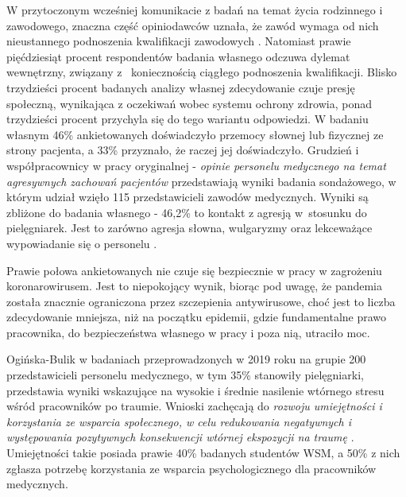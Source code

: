 \documentclass[a4paper,12pt,twoside,openright]{mwrep}
\begin{document}
W przytoczonym wcześniej komunikacie z badań na temat życia rodzinnego i zawodowego, znaczna część opiniodawców uznała, że zawód wymaga od nich nieustannego podnoszenia kwalifikacji zawodowych \cite{komunikat}. Natomiast prawie  pięćdziesiąt  procent respondentów  badania własnego  odczuwa dylemat wewnętrzny, związany z~ koniecznością ciągłego podnoszenia kwalifikacji.
 Blisko trzydzieści procent  badanych analizy własnej  zdecydowanie czuje presję społeczną, wynikająca z oczekiwań wobec systemu ochrony zdrowia,  ponad trzydzieści procent   przychyla się do tego wariantu odpowiedzi.  W badaniu własnym 46\%  ankietowanych doświadczyło przemocy słownej lub fizycznej ze strony pacjenta, a 33\%  przyznało, że  raczej jej doświadczyło.  Grudzień i współpracownicy w pracy oryginalnej - \textit{opinie personelu medycznego na temat agresywnych zachowań pacjentów} przedstawiają wyniki badania sondażowego, w którym udział wzięło 115 przedstawicieli zawodów medycznych. Wyniki są zbliżone do badania własnego - 46,2\% to kontakt z agresją w~stosunku do pielęgniarek. Jest to zarówno agresja słowna, wulgaryzmy oraz lekceważące wypowiadanie się o personelu \cite{grudzien}. 

  Prawie połowa ankietowanych nie  czuje się bezpiecznie w pracy w zagrożeniu koronarowirusem. Jest to niepokojący wynik, biorąc pod uwagę, że pandemia została znacznie ograniczona przez szczepienia antywirusowe, choć  jest to liczba zdecydowanie mniejsza, niż na początku epidemii, gdzie fundamentalne prawo pracownika, do bezpieczeństwa własnego w pracy i poza nią, utraciło moc.


 Ogińska-Bulik w badaniach przeprowadzonych w 2019 roku na grupie 200 przedstawicieli personelu medycznego, w tym 35\% stanowiły pielęgniarki, przedstawia wyniki wskazujące na wysokie i średnie nasilenie wtórnego stresu wśród pracowników po traumie. Wnioski zachęcają do \textit{rozwoju umiejętności i korzystania ze wsparcia społecznego, w celu redukowania negatywnych i występowania pozytywnych konsekwencji wtórnej ekspozycji na traumę} \cite{trauma}. 
  Umiejętności takie posiada prawie 40\% badanych studentów WSM,  a  50\% z nich zgłasza potrzebę korzystania ze wsparcia psychologicznego dla pracowników medycznych.
\end{document}

